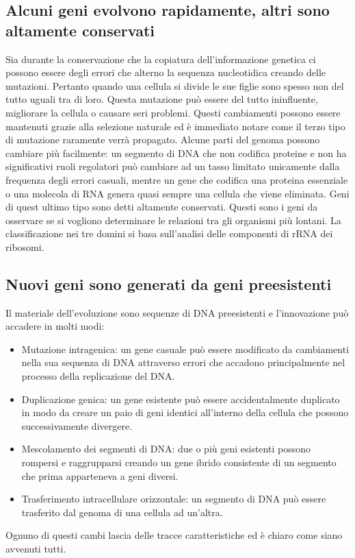 \subsection{Alcuni geni evolvono rapidamente, altri sono altamente conservati}
Sia durante la conservazione che la copiatura dell'informazione genetica ci possono essere degli errori che alterno la sequenza nucleotidica creando delle mutazioni. Pertanto quando una
cellula si divide le sue figlie sono spesso non del tutto uguali tra di loro. Questa mutazione pu\`o essere del tutto ininfluente, migliorare la cellula o causare seri problemi. 
Questi cambiamenti possono essere mantenuti grazie alla selezione naturale ed \`e immediato notare come il terzo tipo di mutazione raramente verr\`a propagato. Alcune parti del genoma
possono cambiare pi\`u facilmente: un segmento di DNA che non codifica proteine e non ha significativi ruoli regolatori pu\`o cambiare ad un tasso limitato unicamente dalla frequenza
degli errori casuali, mentre un gene che codifica una proteina essenziale o una molecola di RNA genera quasi sempre una cellula che viene eliminata. Geni di quest ultimo tipo sono detti
altamente conservati. Questi sono i geni da osservare se si vogliono determinare le relazioni tra gli organismi pi\`u lontani. La classificazione nei tre domini si basa sull'analisi
delle componenti di rRNA dei ribosomi. 
\subsection{Nuovi geni sono generati da geni preesistenti}
Il materiale dell'evoluzione sono sequenze di DNA preesistenti e l'innovazione pu\`o accadere in molti modi:
\begin{itemize}
	\item Mutazione intragenica: un gene casuale pu\`o essere modificato da cambiamenti nella sua sequenza di DNA attraverso errori che accadono principalmente nel processo della
		replicazione del DNA.
	\item Duplicazione genica: un gene esistente pu\`o essere accidentalmente duplicato in modo da creare un paio di geni identici all'interno della cellula che possono 
		successivamente divergere. 
	\item Mescolamento dei segmenti di DNA: due o pi\`u geni esistenti possono rompersi e raggrupparsi creando un gene ibrido consistente di un segmento che prima apparteneva a 
		geni diversi.
	\item Trasferimento intracellulare orizzontale: un segmento di DNA pu\`o essere trasferito dal genoma di una cellula ad un'altra. 
\end{itemize}
Ognuno di questi cambi lascia delle tracce caratteristiche ed \`e chiaro come siano avvenuti tutti.
